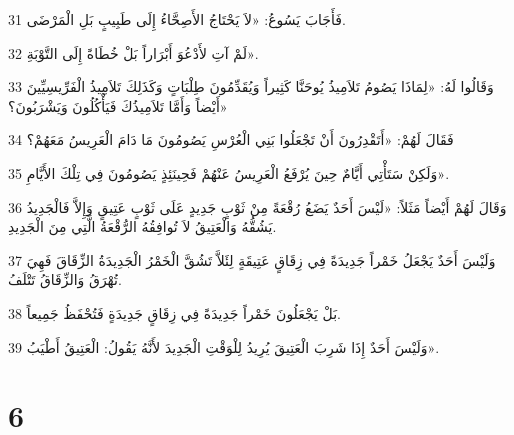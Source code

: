 \par 31 فَأَجَابَ يَسُوعُ: «لاَ يَحْتَاجُ الأَصِحَّاءُ إِلَى طَبِيبٍ بَلِ الْمَرْضَى.
\par 32 لَمْ آتِ لأَدْعُوَ أَبْرَاراً بَلْ خُطَاةً إِلَى التَّوْبَةِ».
\par 33 وَقَالُوا لَهُ: «لِمَاذَا يَصُومُ تَلاَمِيذُ يُوحَنَّا كَثِيراً وَيُقَدِّمُونَ طِلْبَاتٍ وَكَذَلِكَ تَلاَمِيذُ الْفَرِّيسِيِّينَ أَيْضاً وَأَمَّا تَلاَمِيذُكَ فَيَأْكُلُونَ وَيَشْرَبُونَ؟»
\par 34 فَقَالَ لَهُمْ: «أَتَقْدِرُونَ أَنْ تَجْعَلُوا بَنِي الْعُرْسِ يَصُومُونَ مَا دَامَ الْعَرِيسُ مَعَهُمْ؟
\par 35 وَلَكِنْ سَتَأْتِي أَيَّامٌ حِينَ يُرْفَعُ الْعَرِيسُ عَنْهُمْ فَحِينَئِذٍ يَصُومُونَ فِي تِلْكَ الأَيَّامِ».
\par 36 وَقَالَ لَهُمْ أَيْضاً مَثَلاً: «لَيْسَ أَحَدٌ يَضَعُ رُقْعَةً مِنْ ثَوْبٍ جَدِيدٍ عَلَى ثَوْبٍ عَتِيقٍ وَإِلاَّ فَالْجَدِيدُ يَشُقُّهُ وَالْعَتِيقُ لاَ تُوافِقُهُ الرُّقْعَةُ الَّتِي مِنَ الْجَدِيدِ.
\par 37 وَلَيْسَ أَحَدٌ يَجْعَلُ خَمْراً جَدِيدَةً فِي زِقَاقٍ عَتِيقَةٍ لِئَلاَّ تَشُقَّ الْخَمْرُ الْجَدِيدَةُ الزِّقَاقَ فَهِيَ تُهْرَقُ وَالزِّقَاقُ تَتْلَفُ.
\par 38 بَلْ يَجْعَلُونَ خَمْراً جَدِيدَةً فِي زِقَاقٍ جَدِيدَةٍ فَتُحْفَظُ جَمِيعاً.
\par 39 وَلَيْسَ أَحَدٌ إِذَا شَرِبَ الْعَتِيقَ يُرِيدُ لِلْوَقْتِ الْجَدِيدَ لأَنَّهُ يَقُولُ: الْعَتِيقُ أَطْيَبُ».

\chapter{6}

